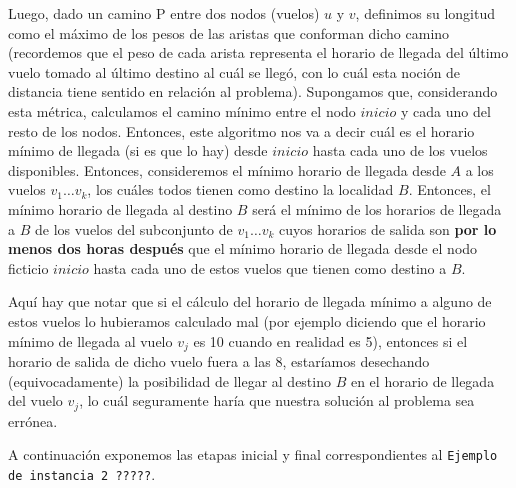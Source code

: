\documentclass[11pt, a4paper, twoside]{article}
\begin{document}
\par Luego, dado un camino P entre dos nodos (vuelos) $u$ y $v$, definimos su longitud como
el máximo de los pesos de las aristas que conforman dicho camino (recordemos que el peso de cada
arista representa el horario de llegada del último vuelo tomado al último destino al cuál se
llegó, con lo cuál esta noción de distancia tiene sentido en relación al problema). 
Supongamos que, considerando 
esta métrica, calculamos el camino mínimo entre el nodo $inicio$ y cada uno del resto de los nodos.
Entonces, este algoritmo nos va a decir cuál es el horario mínimo de llegada (si es que lo hay) 
desde $inicio$ hasta cada uno de los vuelos disponibles. Entonces, consideremos el mínimo
horario de llegada desde $A$ a los vuelos $v_{1} \dots v_{k}$, los cuáles todos tienen como destino la 
localidad $B$. Entonces, el mínimo horario de llegada al destino $B$ será el mínimo de los horarios
de llegada a $B$ de los vuelos del subconjunto de $v_{1} \dots v_{k}$ cuyos horarios de salida son 
\textbf{por lo menos dos horas después} que el mínimo horario de llegada desde el nodo ficticio
$inicio$ hasta cada uno de estos vuelos que tienen como destino a $B$.

\par Aquí hay que notar que si el cálculo del horario de llegada mínimo a
alguno de estos vuelos lo hubieramos calculado mal (por ejemplo diciendo que el horario mínimo de
llegada al vuelo $v_{j}$ es 10 cuando en realidad es 5), entonces si el horario de salida de dicho vuelo
fuera a las 8, estaríamos desechando (equivocadamente) la posibilidad de llegar al destino $B$ en el 
horario de llegada del vuelo $v_{j}$, lo cuál seguramente haría que nuestra solución al problema
sea errónea.

\par A continuación exponemos las etapas inicial y final correspondientes al \texttt{Ejemplo de 
instancia 2 ?????}.
\end{document}
